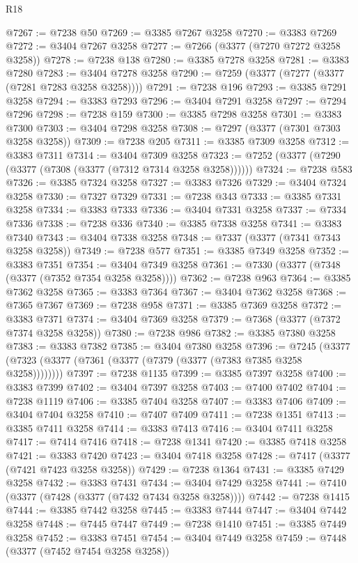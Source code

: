\begin{lexlean}{R18}
\begin{coremodule}
@7267 := @7238 @50
@7269 := @3385 @7267 @3258
@7270 := @3383 @7269
@7272 := @3404 @7267 @3258
@7277 := @7266 (@3377 (@7270 @7272 @3258 @3258))
@7278 := @7238 @138
@7280 := @3385 @7278 @3258
@7281 := @3383 @7280
@7283 := @3404 @7278 @3258
@7290 := @7259 (@3377 (@7277 (@3377 (@7281 @7283 @3258 @3258))))
@7291 := @7238 @196
@7293 := @3385 @7291 @3258
@7294 := @3383 @7293
@7296 := @3404 @7291 @3258
@7297 := @7294 @7296
@7298 := @7238 @159
@7300 := @3385 @7298 @3258
@7301 := @3383 @7300
@7303 := @3404 @7298 @3258
@7308 := @7297 (@3377 (@7301 @7303 @3258 @3258))
@7309 := @7238 @205
@7311 := @3385 @7309 @3258
@7312 := @3383 @7311
@7314 := @3404 @7309 @3258
@7323 := @7252 (@3377 (@7290 (@3377 (@7308 (@3377 (@7312 @7314 @3258 @3258))))))
@7324 := @7238 @583
@7326 := @3385 @7324 @3258
@7327 := @3383 @7326
@7329 := @3404 @7324 @3258
@7330 := @7327 @7329
@7331 := @7238 @343
@7333 := @3385 @7331 @3258
@7334 := @3383 @7333
@7336 := @3404 @7331 @3258
@7337 := @7334 @7336
@7338 := @7238 @336
@7340 := @3385 @7338 @3258
@7341 := @3383 @7340
@7343 := @3404 @7338 @3258
@7348 := @7337 (@3377 (@7341 @7343 @3258 @3258))
@7349 := @7238 @577
@7351 := @3385 @7349 @3258
@7352 := @3383 @7351
@7354 := @3404 @7349 @3258
@7361 := @7330 (@3377 (@7348 (@3377 (@7352 @7354 @3258 @3258))))
@7362 := @7238 @963
@7364 := @3385 @7362 @3258
@7365 := @3383 @7364
@7367 := @3404 @7362 @3258
@7368 := @7365 @7367
@7369 := @7238 @958
@7371 := @3385 @7369 @3258
@7372 := @3383 @7371
@7374 := @3404 @7369 @3258
@7379 := @7368 (@3377 (@7372 @7374 @3258 @3258))
@7380 := @7238 @986
@7382 := @3385 @7380 @3258
@7383 := @3383 @7382
@7385 := @3404 @7380 @3258
@7396 := @7245 (@3377 (@7323 (@3377 (@7361 (@3377 (@7379 (@3377 (@7383 @7385 @3258 @3258))))))))
@7397 := @7238 @1135
@7399 := @3385 @7397 @3258
@7400 := @3383 @7399
@7402 := @3404 @7397 @3258
@7403 := @7400 @7402
@7404 := @7238 @1119
@7406 := @3385 @7404 @3258
@7407 := @3383 @7406
@7409 := @3404 @7404 @3258
@7410 := @7407 @7409
@7411 := @7238 @1351
@7413 := @3385 @7411 @3258
@7414 := @3383 @7413
@7416 := @3404 @7411 @3258
@7417 := @7414 @7416
@7418 := @7238 @1341
@7420 := @3385 @7418 @3258
@7421 := @3383 @7420
@7423 := @3404 @7418 @3258
@7428 := @7417 (@3377 (@7421 @7423 @3258 @3258))
@7429 := @7238 @1364
@7431 := @3385 @7429 @3258
@7432 := @3383 @7431
@7434 := @3404 @7429 @3258
@7441 := @7410 (@3377 (@7428 (@3377 (@7432 @7434 @3258 @3258))))
@7442 := @7238 @1415
@7444 := @3385 @7442 @3258
@7445 := @3383 @7444
@7447 := @3404 @7442 @3258
@7448 := @7445 @7447
@7449 := @7238 @1410
@7451 := @3385 @7449 @3258
@7452 := @3383 @7451
@7454 := @3404 @7449 @3258
@7459 := @7448 (@3377 (@7452 @7454 @3258 @3258))

\end{coremodule}
\end{lexlean}
